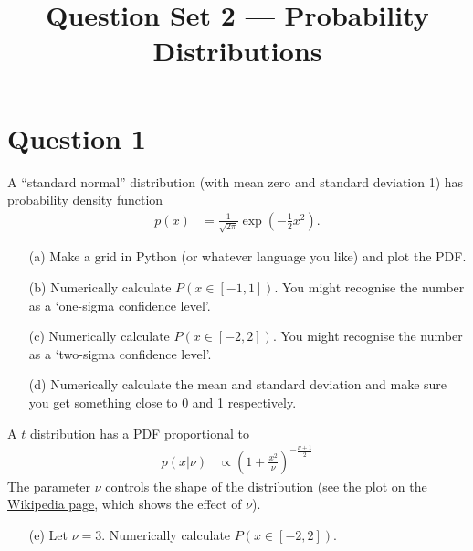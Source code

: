 \documentclass[a4paper, 12pt]{article}
\title{Question Set 2 --- Probability Distributions}
\author{}
\date{}
\begin{document}
\maketitle


\setlength{\parindent}{0pt}
\setlength{\parskip}{8pt}

\section*{Question 1}
A ``standard normal'' distribution (with mean zero and standard deviation 1)
has probability density function
\begin{align}
p(x) &= \frac{1}{\sqrt{2\pi}} \exp\left(-\frac{1}{2}x^2\right).
\end{align}

\begin{enumerate}
\item[(a)] Make a grid in Python (or whatever language you like) and plot
           the PDF.
\item[(b)] Numerically calculate $P(x \in [-1, 1])$. You might recognise the
           number as a `one-sigma confidence level'.
\item[(c)] Numerically calculate $P(x \in [-2, 2])$. You might recognise the
           number as a `two-sigma confidence level'.
\item[(d)] Numerically calculate the mean and standard deviation and make sure
           you get something close to 0 and 1 respectively.
\end{enumerate}

A $t$ distribution has a PDF proportional to
\begin{align}
p(x | \nu) &\propto \left(1 + \frac{x^2}{\nu}\right)^{-\frac{\nu + 1}{2}}
\end{align}
The parameter $\nu$ controls the shape of the distribution
(see the plot on the \href{https://en.wikipedia.org/wiki/Student\%27s_t-distribution}{Wikipedia page}, which shows the effect of $\nu$).

\begin{enumerate}
\item[(e)] Let $\nu=3$. Numerically calculate $P(x \in [-2, 2])$.
\end{enumerate}
\end{document}
